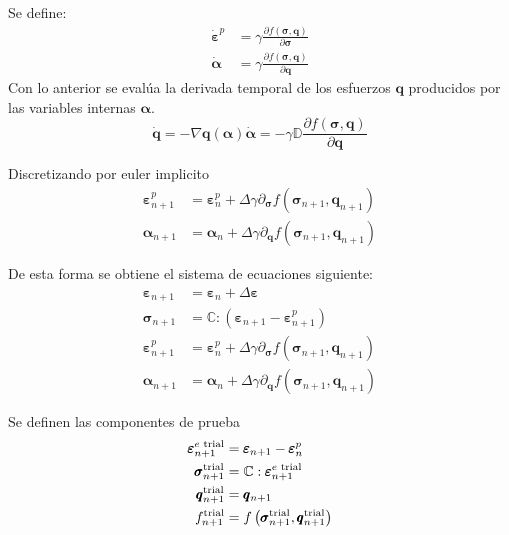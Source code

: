 \documentclass[12pt]{article}
\begin{document}
Se define:
\begin{align} 
    \pmb{\dot\varepsilon}^p &= \gamma \frac{\partial f\left(\pmb{\sigma}, \pmb{q}\right)}{\partial\pmb{\sigma}} \\
    \pmb{\dot \alpha} &= \gamma \frac{\partial f\left(\pmb{\sigma}, \pmb{q}\right)}{\partial\pmb{q}} 
\end{align}
Con lo anterior se evalúa la derivada temporal de los esfuerzos $\pmb{q}$ producidos por las variables internas $\pmb{\alpha}$.
\[ \pmb{\dot q} = -\nabla \pmb{q}\left(\pmb{\alpha}\right) \pmb{\dot\alpha} = -\gamma \mathbb{D} \frac{\partial f\left(\pmb{\sigma}, \pmb{q}\right)}{\partial\pmb{q}}\]

Discretizando por euler implicito
\begin{align} 
    \pmb{\varepsilon}_{n+1}^p &= \pmb{\varepsilon}_{n}^p + \Delta\gamma\partial_{\pmb{\sigma}} f\left(\pmb{\sigma}_{n+1}, \pmb{q}_{n+1}\right) \\
    \pmb{\alpha}_{n+1} &= \pmb{\alpha}_{n} + \Delta\gamma\partial_{\pmb{q}} f\left(\pmb{\sigma}_{n+1}, \pmb{q}_{n+1}\right)
\end{align}

De esta forma se obtiene el sistema de ecuaciones siguiente:
\begin{align} 
\pmb{\varepsilon}_{n+1} &= \pmb{\varepsilon}_n + \Delta\pmb{\varepsilon} \\
\pmb{\sigma}_{n+1} &= \mathbb{C} : \left( \pmb{\varepsilon}_{n+1} - \pmb{\varepsilon}_{n+1}^p \right) \\
\pmb{\varepsilon}_{n+1}^p &= \pmb{\varepsilon}_{n}^p + \Delta\gamma\partial_{\pmb{\sigma}} f\left(\pmb{\sigma}_{n+1}, \pmb{q}_{n+1}\right)\\
\pmb{\alpha}_{n+1} &= \pmb{\alpha}_{n} + \Delta\gamma\partial_{\pmb{q}} f\left(\pmb{\sigma}_{n+1}, \pmb{q}_{n+1}\right)
\end{align}

Se definen las componentes de prueba
\begin{align} 
    \pmb{\varepsilon}_{n+1}^{e\textnormal{ trial}} &= \pmb{\varepsilon}_{n+1} - \pmb{\varepsilon}_{n}^p \\
    \pmb{\sigma}_{n+1}^{\textnormal{trial}} &= \mathbb{C} : \pmb{\varepsilon}_{n+1}^{e\textnormal{ trial}} \\
    \pmb{q}_{n+1}^{\textnormal{trial}} &= \pmb{q}_{n+1} \\
    f_{n+1}^{\textnormal{trial}} &= f\left(\pmb{\sigma}_{n+1}^{\textnormal{trial}}, \pmb{q}_{n+1}^{\textnormal{trial}}\right)
\end{align}
\end{document}
